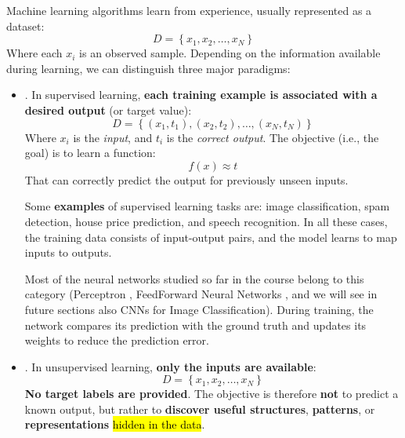 \highspace
Machine learning algorithms learn from experience, usually represented as a dataset:
\begin{equation*}
    D = \left\{x_1, x_2, \ldots, x_{N}\right\}
\end{equation*}
Where each $x_i$ is an observed sample. Depending on the information available during learning, we can distinguish three major paradigms:
\begin{itemize}
    \item {}. In supervised learning, \textbf{each training example is associated with a desired output} (or target value):
    \begin{equation*}
        D = \left\{(x_1, t_1), (x_2, t_2), \ldots, (x_{N}, t_{N})\right\}
    \end{equation*}
    Where $x_i$ is the \emph{input}, and $t_i$ is the \emph{correct output}. The objective (i.e., the goal) is to learn a function:
    \begin{equation*}
        f(x) \approx t
    \end{equation*}
    That can correctly predict the output for previously unseen inputs.

    \highspace
    Some \textbf{examples} of supervised learning tasks are: image classification, spam detection, house price prediction, and speech recognition. In all these cases, the training data consists of input-output pairs, and the model learns to map inputs to outputs.

    \highspace
    Most of the neural networks studied so far in the course belong to this category (Perceptron , FeedForward Neural Networks , and we will see in future sections also CNNs for Image Classification). During training, the network compares its prediction with the ground truth and updates its weights to reduce the prediction error.
    
    
    \item {}. In unsupervised learning, \textbf{only the inputs are available}:
    \begin{equation*}
        D = \left\{x_1, x_2, \ldots, x_{N}\right\}
    \end{equation*}
    \textbf{No target labels are provided}. The objective is therefore \textbf{not} to predict a known output, but rather to \textbf{discover useful structures}, \textbf{patterns}, or \textbf{representations} \hl{hidden in the data}.


\end{itemize}
